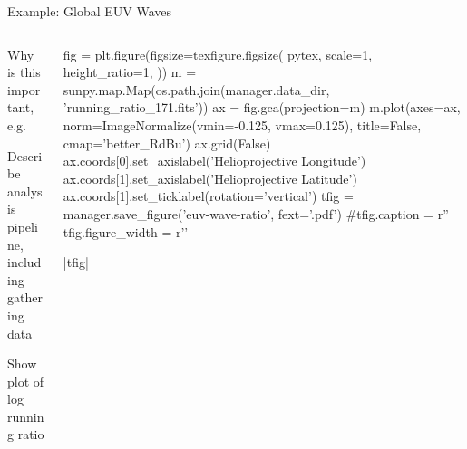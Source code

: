 \begin{block}{Example: Global EUV Waves}

\begin{columns}
\begin{column}{0.6\columnwidth}
Why is this important, e.g. \citet{liu_truly_2018}

Describe analysis pipeline, including gathering data

Show plot of log running ratio
\end{column}

\begin{column}{0.4\columnwidth}
\begin{pycode}[manager]
fig = plt.figure(figsize=texfigure.figsize(
  pytex,
  scale=1,
  height_ratio=1,
))
m = sunpy.map.Map(os.path.join(manager.data_dir, 'running_ratio_171.fits'))
ax = fig.gca(projection=m)
m.plot(axes=ax,
       norm=ImageNormalize(vmin=-0.125, vmax=0.125),
       title=False,
       cmap='better_RdBu')
ax.grid(False)
ax.coords[0].set_axislabel('Helioprojective Longitude')
ax.coords[1].set_axislabel('Helioprojective Latitude')
ax.coords[1].set_ticklabel(rotation='vertical')
tfig = manager.save_figure('euv-wave-ratio', fext='.pdf')
#tfig.caption = r''
tfig.figure_width = r'\columnwidth'
\end{pycode}
\py[manager]|tfig|
\end{column}

\end{columns}

\end{block}

